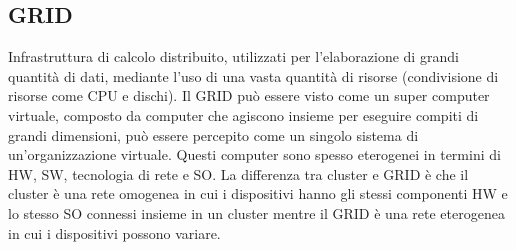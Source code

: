 \documentclass[12pt,italian]{report}
\begin{document}
\subsection{GRID}
\label{sec: grid}
Infrastruttura di calcolo distribuito, utilizzati per l'elaborazione di grandi quantità di dati, mediante l'uso di una vasta quantità di risorse (condivisione di risorse come CPU e dischi). Il GRID può essere visto come un super computer virtuale, composto da computer che agiscono insieme per eseguire compiti di grandi dimensioni, può essere percepito come un singolo sistema di un'organizzazione virtuale. Questi computer sono spesso eterogenei in termini di HW, SW, tecnologia di rete e SO. 
\bigbreak
La differenza tra cluster e GRID è che il cluster è una rete omogenea in cui i dispositivi hanno gli stessi componenti HW e lo stesso SO connessi insieme in un cluster mentre il GRID è una rete eterogenea in cui i dispositivi possono variare.
\end{document}

